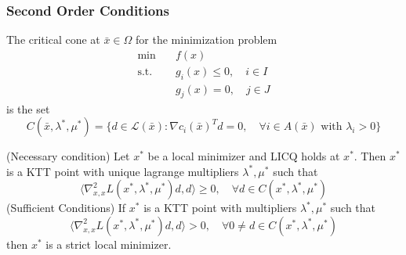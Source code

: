 \subsubsection{Second Order Conditions}
\begin{definition}
    The critical cone at $\bar x \in \Omega$ for the minimization problem 
    \begin{align*}
        \min \quad &f(x) \\
        \text{s.t.} \quad &g_i(x) \leq 0, \quad i \in I \\
        &g_j(x) = 0, \quad j \in J
    \end{align*}
    is the set $$C(\bar x, \lambda^*, \mu^*) = \{d \in \mathcal L(\bar x): \nabla c_i(\bar x)^T d = 0, \quad \forall i \in A(\bar x) \text{ with } \lambda_i > 0\}$$
\end{definition}
\begin{theorem}
    (Necessary condition) Let $x^*$ be a local minimizer and LICQ holds at $x^*$. Then $x^*$ is a KTT point with unique lagrange multipliers $\lambda^*, \mu^*$ such that $$\langle \nabla^2_{x, x} L(x^*, \lambda^*, \mu^*)d, d \rangle \geq 0, \quad \forall d \in C(x^*, \lambda^*, \mu^*)$$
    (Sufficient Conditions) If $x^*$ is a KTT point with multipliers $\lambda^*, \mu^*$ such that $$\langle \nabla^2_{x, x} L(x^*, \lambda^*, \mu^*)d, d \rangle > 0, \quad \forall 0 \neq d \in C(x^*, \lambda^*, \mu^*)$$ then $x^*$ is a strict local minimizer. 
\end{theorem}
